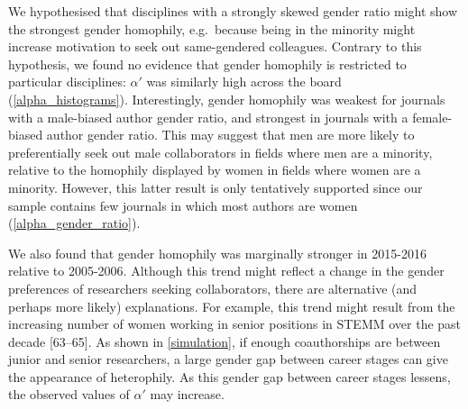 \documentclass[12pt,]{article}
\begin{document}
We hypothesised that disciplines with a strongly skewed gender ratio
might show the strongest gender homophily, e.g.~because being in the
minority might increase motivation to seek out same-gendered colleagues.
Contrary to this hypothesis, we found no evidence that gender homophily
is restricted to particular disciplines: \(\alpha'\) was similarly high
across the board (\autoref{alpha_histograms}). Interestingly, gender
homophily was weakest for journals with a male-biased author gender
ratio, and strongest in journals with a female-biased author gender
ratio. This may suggest that men are more likely to preferentially seek
out male collaborators in fields where men are a minority, relative to
the homophily displayed by women in fields where women are a minority.
However, this latter result is only tentatively supported since our
sample contains few journals in which most authors are women
(\autoref{alpha_gender_ratio}).

We also found that gender homophily was marginally stronger in 2015-2016
relative to 2005-2006. Although this trend might reflect a change in the
gender preferences of researchers seeking collaborators, there are
alternative (and perhaps more likely) explanations. For example, this
trend might result from the increasing number of women working in senior
positions in STEMM over the past decade {[}63--65{]}. As shown in
\autoref{simulation}, if enough coauthorships are between junior and
senior researchers, a large gender gap between career stages can give
the appearance of heterophily. As this gender gap between career stages
lessens, the observed values of \(\alpha'\) may increase.
\end{document}
